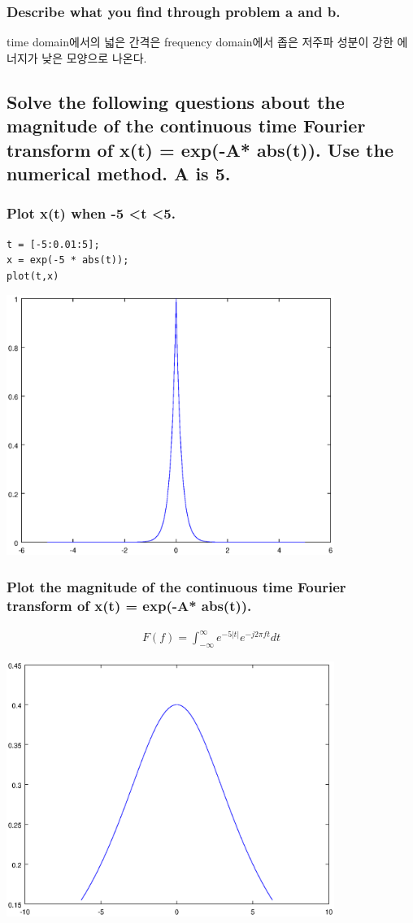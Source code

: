 \documentclass[12pt,a4paper]{article}
\begin{document}
\subsubsection{Describe what you find through problem a and b.}
time domain에서의 넓은 간격은 frequency domain에서 좁은 저주파 성분이 강한 에너지가 낮은 모양으로 나온다.

\subsection{Solve the following questions about the magnitude of the continuous time Fourier transform of x(t) = exp(-A* abs(t)). Use the numerical method. A is 5.}

\subsubsection{Plot x(t) when -5 \textless t \textless 5.} 
\begin{lstlisting}
t = [-5:0.01:5];
x = exp(-5 * abs(t));
plot(t,x)
\end{lstlisting}
\includegraphics[width=0.8\textwidth]{2.eps}

\subsubsection{Plot the magnitude of the continuous time Fourier transform of x(t) = exp(-A* abs(t)).}
\begin{gather*}
F(f) = \int_{-\infty}^{\infty}e^{-5|t|}e^{-j2\pi ft}dt
\end{gather*}

\includegraphics[width=0.8\textwidth]{3.eps}
\end{document}
